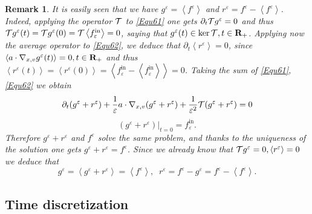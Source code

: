 \documentclass[12pt, a4paper]{article}
\providecommand\mathbb{\bf}
\newcommand\R{{\mathbb R}}
\newtheorem{remark}{Remark}[section]
\newcounter{Remark}
\newcommand{\eps}[0]{
\varepsilon}
\newcommand{\fe}[0]{
f ^\varepsilon}
\newcommand{\re}[0]{
r ^\varepsilon}
\newcommand{\geps}[0]{
g ^\varepsilon}
\newcommand{\fine}[0]{
f ^{\mathrm{in}}_{\varepsilon}}
\newcommand{\nxv}[0]{
\nabla_{x,v}}
\newcommand{\ave}[1]{
\left \langle #1 \right \rangle }
\begin{document}
\begin{remark}
\label{Equivalence} It is easily seen that we have $\geps = \ave{\fe}$ and $\re = \fe - \ave{\fe}$. Indeed, applying the operator ${\cal T}$ to \eqref{Equ61} one gets
$
\partial _t {\cal T} \geps = 0
$
and thus ${\cal T} \geps (t) = {\cal T} \geps (0) = {\cal T} \ave{\fine} = 0$, saying that $\geps (t) \in \ker {\cal T}, t \in \R_+$. Applying now the average operator to \eqref{Equ62}, we deduce that $\partial _t \ave{\re} = 0$, since $\ave{a \cdot \nxv \geps (t)} = 0, t \in \R_+$ and thus $\ave{\re (t)} = \ave{\re (0)} = \ave{\fine - \ave{\fine}} = 0$. Taking the sum of \eqref{Equ61}, \eqref{Equ62} we obtain
\[
\partial _t ( \geps + \re) + \frac{1}{\eps} a \cdot \nxv ( \geps + \re) + \frac{1}{\eps ^2} {\cal T} ( \geps + \re) = 0
\]
\[
( \geps + \re)|_{t = 0} = \fine.
\]
Therefore $\geps + \re$ and $\fe$ solve the same problem, and thanks to the uniqueness of the solution one gets $\geps + \re = \fe$. Since we already know that ${\cal T}\geps = 0, \ave{\re} = 0$ we deduce that 
\[
\geps = \ave{\geps + \re} = \ave{\fe},\;\;\re = \fe - \geps = \fe - \ave{\fe}.
\]
\end{remark}

\subsection{Time discretization}
\end{document}
